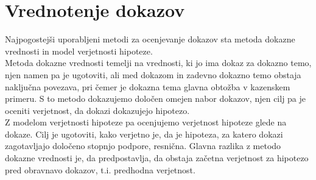 \documentclass[12pt,a4paper]{amsart}
\theoremstyle{definition} %
\theoremstyle{plain} %
\begin{document}
\section{Vrednotenje dokazov}
Najpogostejši uporabljeni metodi za ocenjevanje dokazov sta metoda dokazne vrednosti in model verjetnosti hipoteze.\\
Metoda dokazne vrednosti temelji na vrednosti, ki jo ima dokaz za dokazno temo, njen namen pa je ugotoviti, ali med dokazom in zadevno dokazno temo 
obstaja naključna povezava, pri čemer je dokazna tema glavna obtožba v kazenskem primeru. S to metodo dokazujemo določen omejen nabor dokazov, njen cilj pa 
je oceniti verjetnost, da dokazi dokazujejo hipotezo.\\
Z modelom verjetnosti hipoteze pa ocenjujemo verjetnost hipoteze glede na dokaze. Cilj je ugotoviti, kako verjetno je, da je hipoteza, za katero dokazi 
zagotavljajo določeno stopnjo podpore, resnična. Glavna razlika z metodo dokazne vrednosti je, da predpostavlja, da obstaja začetna verjetnost za hipotezo 
pred obravnavo dokazov, t.i. predhodna verjetnost.\\\\

\end{document}
